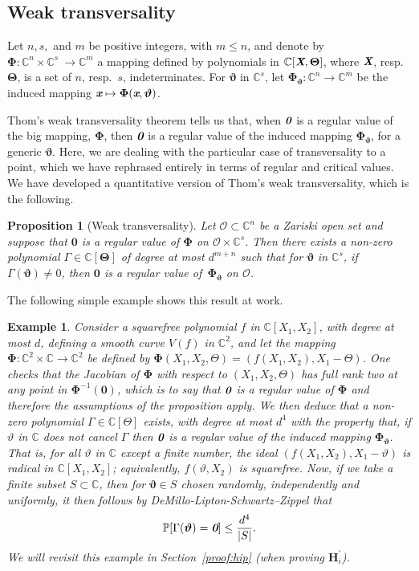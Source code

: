 \documentclass[a4paper]{article}
\def\bz{\textit{\textbf{0}}}
\def\Xb{\textit{\textbf{X}}}
\def\Thetab{\bm{\Theta}}
\def\thetab{\bm{\vartheta}}
\def\xb{\textit{\textbf{x}}}
\def\vt{\vartheta}
\def\dt{s}
\def\C{\mathbb{C}}
\newtheorem{ex}[theorem]{Example}
\newtheorem{prop}[theorem]{Proposition}
\begin{document}
\subsection{Weak transversality}
Let $n,\dt,$ and $m$ be positive integers, with $m \le n$, and denote
by $\bm\Phi :\C^n \times \C^{\dt} ~ \rightarrow \C^{m}$ a mapping
defined by polynomials in $\C[\Xb,\Thetab]$, where $\Xb$,
resp.\ $\Thetab$, is a set of $n$, resp.\ $\dt$, indeterminates.  For
$\thetab$ in $\C^{\dt}$, let $\bm\Phi_{\thetab} : \C^n \rightarrow
\C^{m}$ be the induced mapping $\xb\mapsto \bm\Phi(\xb,\thetab)$.  

Thom’s weak transversality theorem tells us that, when $\bz$ is a regular value of the big mapping, $\bm \Phi$, then $\bz$ is a regular value of the induced mapping $\bm \Phi_{\bm \vt}$, for a generic $\bm \vt$. Here, we are dealing with the particular case of transversality to a point, which we have rephrased entirely in terms of regular and critical values. We have developed a quantitative version of Thom’s weak transversality, which is the following.

\begin{prop} [Weak transversality]\label{prop:weak_t}
Let $\mathscr{O} \subset \C^n$ be a Zariski open set and suppose that $\bm 0$ is a regular value of $\bm\Phi$ on $\mathscr{O} \times \C^{s}$. Then there
    exists a non-zero polynomial $\Gamma \in \C[\Thetab]$ of degree at
    most $d^{m+n}$ such that for $\thetab$ in $\C^\dt$, if
    $\Gamma(\thetab)\ne 0$, then $\bm 0$ is a regular value
    of~$\bm\Phi_{\thetab}$ on $\mathscr{O}$.
\end{prop}
\noindent 
The following simple example shows this result at work. 
%
\begin{ex}
Consider a
squarefree polynomial $f$ in $\C[X_1,X_2]$, with degree at most $d$, defining a smooth curve  $V(f)$ in
$\C^2$, and let the mapping $\bm\Phi:\C^2\times \C \to \C^2$ be
defined by $\bm\Phi(X_1,X_2,\Theta) = (f(X_1,X_2), X_1-\Theta)$. One
checks that the Jacobian of $\bm\Phi$ with respect to
$(X_1,X_2,\Theta)$ has full rank two at any point in $\bm\Phi^{-1}(\bm 0)$, which is to say that $\bz$ is a regular value of $\bm \Phi$ and therefore the assumptions of the proposition apply. We then deduce that a non-zero polynomial $\Gamma \in \C[\Theta]$ exists, with degree at most $d^{4}$ with the property that, if $\vartheta$ in $\C$ does not cancel $\Gamma$ then $\bz$ is a regular value of the induced mapping $\bm \Phi_{\bm \vt}$. That is, for all $\vartheta$ in $\C$
except a finite number, the ideal $(f(X_1,X_2), X_1-\vartheta)$ is
radical in $\C[X_1,X_2]$; equivalently, $f(\vartheta, X_2)$ is
squarefree. Now, if we take a finite subset $S \subset \C$, then for $\bm \vt \in S$ chosen randomly, independently and uniformly, it then follows by DeMillo-Lipton-Schwartz–Zippel that 
\[
\mathbb{P}[\Gamma(\bm \vt) = \bz] \leq \frac{d^4}{|S|}.
\]
We will revisit this example in Section~\ref{proof:hip} (when proving $\bm H_i^{'}$).
\end{ex}
%
\end{document}
